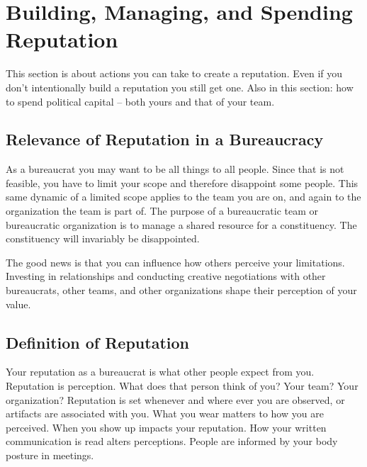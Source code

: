 \section{Building, Managing, and Spending Reputation\label{sec:reputation}}




This section is about actions you can take to create a reputation. Even if you don't intentionally build a reputation you still get one. Also in this section: how to spend political capital -- both yours and that of your team. 

\subsection*{Relevance of Reputation in a Bureaucracy}

As a bureaucrat you may want to be all things to all people. Since that is not feasible, you have to limit your scope and therefore disappoint some people. This same dynamic of a limited scope applies to the team you are on, and again to the organization the team is part of. The purpose of a bureaucratic team or bureaucratic organization is to manage a shared resource for a constituency. The constituency will invariably be disappointed. 

The good news is that you can influence how others perceive your limitations. Investing in relationships and conducting creative negotiations with other bureaucrats, other teams, and other organizations shape their perception of your value. 

\subsection*{Definition of Reputation}

Your \gls{reputation} as a bureaucrat is what other people expect from you.
Reputation is perception. What does that person think of you? Your team? Your organization? 
Reputation is set whenever and where ever you are observed, or artifacts are associated with you. 
What you wear matters to how you are perceived. When you show up impacts your reputation. How your written communication is read alters perceptions. People are informed by your body posture in meetings. 

